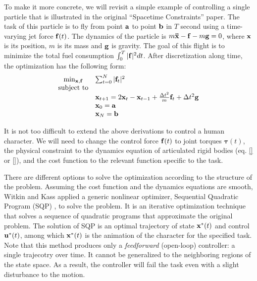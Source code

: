 To make it more concrete, we will revisit a simple example of controlling a single particle that is illustrated in the original ``Spacetime Constraints'' paper.
The task of this particle is to fly from point $\mathbf{a}$ to point $\mathbf{b}$ in $T$ second using a time-varying jet force $\mathbf{f}(t)$. The dynamics of the particle is $m\mathbf{\ddot{x}}-\mathbf{f}-m\mathbf{g}=0$, where $\mathbf{x}$ is its position, $m$ is its mass and $\mathbf{g}$ is gravity. The goal of this flight is to minimize the total fuel consumption $\int_0^T|\mathbf{f}|^2dt$. After discretization along time, the optimization has the following form:
\begin{displaymath}
  \begin{array}{cl}
    \min_{\mathbf{x},\mathbf{f}}&\sum_{t=0}^{N}|\mathbf{f}_t|^2\\
    \textrm{subject to}&\\
    &\mathbf{x}_{t+1}= 2\mathbf{x}_{t} -\mathbf{x}_{t-1}+\frac{\Delta t^2}{m}\mathbf{f}_t+\Delta t^2\mathbf{g}\\
    &\mathbf{x}_0=\mathbf{a}\\
    &\mathbf{x}_N=\mathbf{b}
  \end{array}
  \end{displaymath}

It is not too difficult to extend the above derivations to control a human character. We will need to change the control force $\mathbf{f}(t)$ to joint torques $\boldsymbol{\tau}(t)$, the physical constraint to the dynamics equation of articulated rigid bodies (eq. \ref{} or \ref{}), and the cost function to the relevant function specific to the task.

There are different options to solve the optimization according to the structure of the problem. Assuming the cost function and the dynamics equations are smooth, Witkin and Kass \cite{} applied a generic nonlinear optimizer, Sequential Quadratic Program (SQP) \cite{}, to solve the problem. It is an iterative optimization technique that solves a sequence of quadratic programs that approximate the original problem. The solution of SQP is an optimal trajectory of state $\mathbf{x}^*(t)$ and control $\mathbf{u}^*(t)$, among which $\mathbf{x}^*(t)$ is the animation of the character for the specified task. Note that this method produces only a \emph{feedforward} (open-loop) controller: a single trajecotry over time. It cannot be generalized to the neighboring regions of the state space. As a result, the controller will fail the task even with a slight disturbance to the motion.

